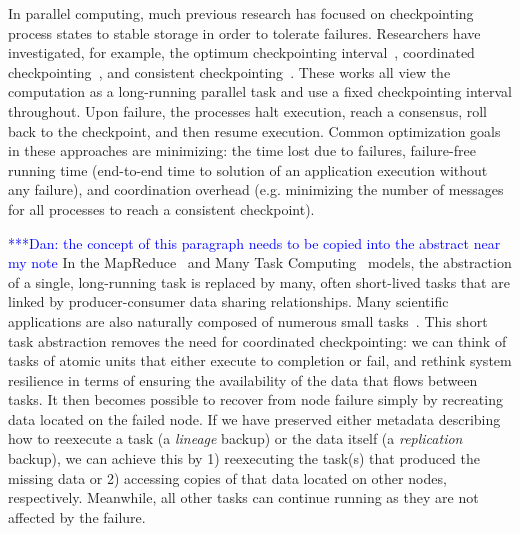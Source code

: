 \documentclass{sig-alternate}
\newcommand{\katznote}[1]{ {\textcolor{blue}    { ***Dan:      #1 }}}
\newcommand{\katznote}[1]{}
\begin{document}
In parallel computing, much previous research has focused on checkpointing process states to stable storage in order to tolerate failures. Researchers have investigated, for example, the optimum checkpointing interval~\cite{young1974first, daly2006higher}, coordinated checkpointing~\cite{chandy1985distributed}, and consistent checkpointing~\cite{elnozahy1992performance}. These works all view the computation as a long-running parallel task and use a fixed checkpointing interval throughout. 
Upon failure, the processes halt execution, reach a consensus, roll back to the checkpoint, and then resume execution. 
Common optimization goals in these approaches are minimizing: the time lost due to failures, failure-free running time (end-to-end time to solution of an application execution without any failure), and coordination overhead (e.g. minimizing the number of messages for all processes to reach a consistent checkpoint). 

\katznote{the concept of this paragraph needs to be copied into the abstract near my note}
In the MapReduce~\cite{mapreduce-04} and Many Task Computing~\cite{raicu08} models,
the abstraction of a single, long-running task is replaced by many, often short-lived tasks 
that are linked by producer-consumer data sharing relationships.
Many scientific applications are also naturally composed of numerous small tasks~\cite{FALKON-SC-08}. 
This short task abstraction removes the need for coordinated checkpointing: we can think of tasks of atomic units that either execute to completion
or fail, and rethink system resilience in terms of ensuring the availability of the data that flows between tasks.
It then becomes possible to recover from node failure simply by recreating data located on the failed node. 
If we have preserved either metadata describing how to reexecute a task (a {\em lineage} backup) or the data itself (a {\em replication} backup),
we can achieve this by 1) reexecuting the task(s) that produced the missing data or 2) accessing copies of that data located on other nodes, respectively.
Meanwhile, all other tasks can continue running as they are not affected by the failure.
\end{document}
